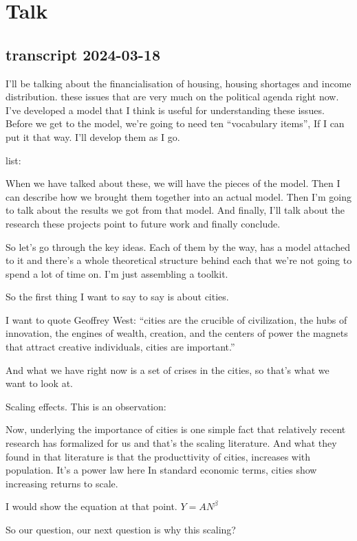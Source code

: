 \chapter{Talk}

\section{transcript 2024-03-18}

I'll be talking about the financialisation of housing, housing shortages and income distribution. these issues that are very much on the political agenda right now.  I've developed a model that I think is useful for understanding these issues.  Before we get to the model, we're going to need ten ``vocabulary items'', If I can put it that way. I'll develop them as I go.

list: 

When we have talked about these, we will have the pieces of the model. 
Then I can describe how we brought them together into an actual model.
Then I'm going to talk about the results we got from that model. 
And finally, I'll talk about the research these projects point to future work and finally conclude. 

So let's go through the key ideas. Each of them by the way, has a model attached to it and there's a whole theoretical structure behind each that we're not going to spend a lot of time on. I'm just assembling a toolkit. 

So the first thing  I want to say to say is about cities. 

I want to quote Geoffrey West:
``cities are the crucible of civilization, the hubs of innovation, the engines of wealth, creation, and the centers of power the magnets that attract creative individuals, cities are important.''


And what we have right now is a set of crises in the cities, so that's what we want to look at. 

Scaling effects. This is an  observation:

Now, underlying the importance of cities is one simple fact that relatively recent research has formalized for us and that's the scaling literature. And what they found in that literature is that the producttivity of cities, increases with population. It's a power law here 
In standard economic terms, cities show increasing returns to scale.


I would show the equation at that point. 
$Y=AN^\beta$

So our question, our next question is why this scaling?

